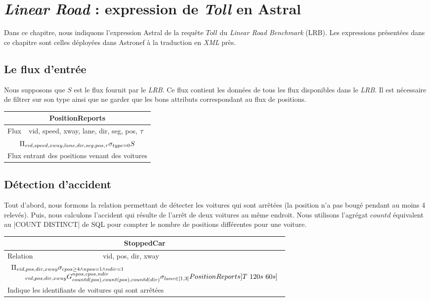 \chapter{\textit{Linear Road} : expression de \textit{Toll} en Astral}\label{chap:misc:lrb}
\mtcaddchapter
\chaptertoc

\def\result#1#2#3#4#5{
\def\arraystretch{1.5}
\noindent\begin{tabular}{|p{0.2\textwidth}|p{0.74\textwidth}|}\bottomrule
 \multicolumn{2}{|c|}{\cellcolor{hypcolor}#1} \\ \hline
#2 & #3 \\ \hline
\multicolumn{2}{|c|}{$\displaystyle #4$}\\ \hline
\multicolumn{2}{|l|}{#5}\\ \toprule
\end{tabular}
\def\arraystretch{1}
}

Dans ce chapitre, nous indiquons l'expression Astral de la requête $Toll$ du \textit{Linear Road Benchmark} (LRB). Les expressions présentées dans ce chapitre sont celles déployées dans Astronef à la traduction en \textit{XML} près.

\section{Le flux d'entrée}
Nous supposons que $S$ est le flux fournit par le \textit{LRB}. Ce flux contient les données de tous les flux disponibles dans le \textit{LRB}. Il est nécessaire de filtrer sur son type ainsi que ne garder que les bons attributs correspondant au flux de positions.

\result{PositionReports}{Flux}{vid, speed, xway, lane, dir, seg, pos, $\tau$}
	{\Pi_{vid,speed,xway,lane,dir,seg,pos,\t}\sigma_{type=0} S}
	{Flux entrant des positions venant des voitures}

\section{Détection d'accident}
Tout d'abord, nous formons la relation permettant de détecter les voitures qui sont arrêtées (la position n'a pas bougé pendant au moins 4 relevés). Puis, nous calculons l'accident qui résulte de l'arrêt de deux voitures au même endroit. Nous utilisons l'agrégat $countd$ équivalent au \sql|COUNT DISTINCT| de SQL pour compter le nombre de positions différentes pour une voiture.

\result{StoppedCar}{Relation}{vid, pos, dir, xway}
	{\begin{array}{l}\Pi_{vid,pos,dir,xway}\sigma_{cpos \geq 4 \wedge npos = 1 \wedge ndir = 1}\\ \qquad\null_{vid,pos,dir,xway}G_{countd(pos), count(pos), countd(dir)}^{npos, cpos, ndir}\sigma_{lane \in [1,3]} PositionReports]T\ 120s\ 60s]\end{array}}
	{Indique les identifiants de voitures qui sont arrêtées}

